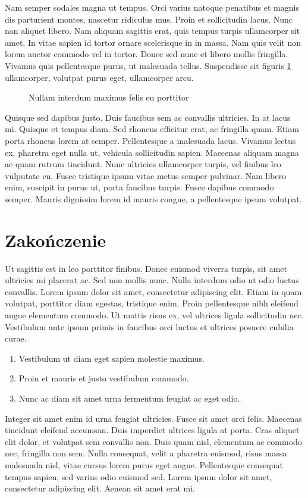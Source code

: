 \documentclass[polish,engineering]{wizthesis}
\begin{document}
Nam semper sodales magna ut tempus. Orci varius natoque penatibus et magnis dis parturient montes, nascetur ridiculus mus. Proin et sollicitudin lacus. Nunc non aliquet libero. Nam aliquam sagittis erat, quis tempus turpis ullamcorper sit amet. In vitae sapien id tortor ornare scelerisque in in massa. Nam quis velit non lorem auctor commodo vel in tortor. Donec sed nunc et libero mollis fringilla. Vivamus quis pellentesque purus, ut malesuada tellus. Suspendisse sit figuris \ref{fig:wykres} ullamcorper, volutpat purus eget, ullamcorper arcu.
\begin{figure}[ht]
  \centering
  
  \caption{Nullam interdum maximus felis eu porttitor}
  \label{fig:wykres}
\end{figure}
Quisque sed dapibus justo. Duis faucibus sem ac convallis ultricies. In at lacus mi. Quisque et tempus diam. Sed rhoncus efficitur erat, ac fringilla quam. Etiam porta rhoncus lorem at semper. Pellentesque a malesuada lacus. Vivamus lectus ex, pharetra eget nulla ut, vehicula sollicitudin sapien. Maecenas aliquam magna ac quam rutrum tincidunt. Nunc ultricies ullamcorper turpis, vel finibus leo vulputate eu. Fusce tristique ipsum vitae metus semper pulvinar. Nam libero enim, suscipit in purus ut, porta faucibus turpis. Fusce dapibus commodo semper. Mauris dignissim lorem id mauris congue, a pellentesque ipsum volutpat.

{\backmatter\chapter{Zakończenie}} %

Ut sagittis est in leo porttitor finibus. Donec euismod viverra turpis, sit amet ultricies mi placerat ac. Sed non mollis nunc. Nulla interdum odio ut odio luctus convallis. Lorem ipsum dolor sit amet, consectetur adipiscing elit. Etiam in quam volutpat, porttitor diam egestas, tristique enim. Proin pellentesque nibh eleifend augue elementum commodo. Ut mattis risus ex, vel ultrices ligula sollicitudin nec. Vestibulum ante ipsum primis in faucibus orci luctus et ultrices posuere cubilia curae.
\begin{enumerate}[noitemsep]
  \item Vestibulum ut diam eget sapien molestie maximus.
  \item Proin et mauris et justo vestibulum commodo.
  \item Nunc ac diam sit amet urna fermentum feugiat ac eget odio.
\end{enumerate}
Integer sit amet enim id urna feugiat ultricies. Fusce sit amet orci felis. Maecenas tincidunt eleifend accumsan. Duis imperdiet ultrices ligula at porta. Cras aliquet elit dolor, et volutpat sem convallis non. Duis quam nisl, elementum ac commodo nec, fringilla non sem. Nulla consequat, velit a pharetra euismod, risus massa malesuada nisl, vitae cursus lorem purus eget augue. Pellentesque consequat tempus sapien, sed varius odio euismod sed. Lorem ipsum dolor sit amet, consectetur adipiscing elit. Aenean sit amet erat mi.
\end{document}
